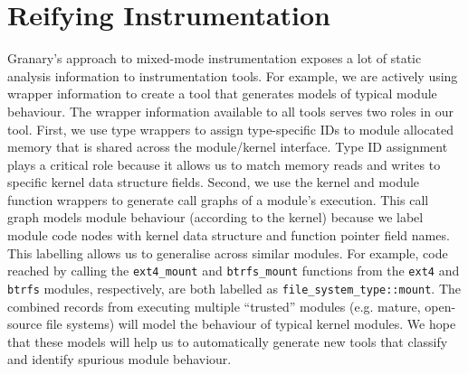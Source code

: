 \documentclass{sigplanconf}
\begin{document}
\section{Reifying Instrumentation}\label{sec:reify}

Granary's approach to mixed-mode instrumentation exposes a lot of static analysis information to instrumentation tools. For example, we are actively using wrapper information to create a tool that generates models of typical module behaviour. The wrapper information available to all tools serves two roles in our tool. First, we use type wrappers to assign type-specific IDs to module allocated memory that is shared across the module/kernel interface. Type ID assignment plays a critical role because it allows us to match memory reads and writes to specific kernel data structure fields. Second, we use the kernel and module function wrappers to generate call graphs of a module's execution. This call graph models module behaviour (according to the kernel) because we label module code nodes with kernel data structure and function pointer field names. This labelling allows us to generalise across similar modules. For example, code reached by calling the \texttt{ext4\_mount} and \texttt{btrfs\_mount} functions from the \texttt{ext4} and \texttt{btrfs} modules, respectively, are both labelled as \texttt{file\_system\_type::mount}. The combined records from executing multiple ``trusted'' modules (e.g. mature, open-source file systems) will model the behaviour of typical kernel modules. We hope that these models will help us to automatically generate new tools that classify and identify spurious module behaviour.







\end{document}
